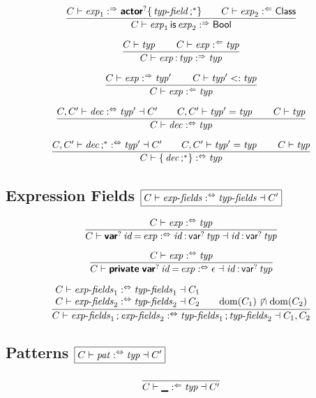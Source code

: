 $$
\frac{
  C \vdash \x{exp}_1 \synth \KK{actor}^? \K\{ \x{typ-field}\K;^\ast \K\}
  \qquad
  C \vdash \x{exp}_2 \anal \K{Class}
}{
  C \vdash \x{exp}_1 \K{is} \x{exp}_2 \synth \K{Bool}
}
$$

$$
\frac{
  C \vdash \x{typ}
  \qquad
  C \vdash \x{exp} \anal \x{typ}
}{
  C \vdash \x{exp} \K: \x{typ} \synth \x{typ}
}
$$

$$
\frac{
  C \vdash \x{exp} \synth \x{typ}'
  \qquad
  C \vdash \x{typ}' <: \x{typ}
}{
  C \vdash \x{exp} \anal \x{typ}
}
$$

$$
\frac{
  C, C' \vdash \x{dec} \analsynth \x{typ}' \dashv C'
  \qquad
  C, C' \vdash \x{typ}' = \x{typ}
  \qquad
  C \vdash \x{typ}
}{
  C \vdash \x{dec} \analsynth \x{typ}
}
$$

$$
\frac{
  C, C' \vdash \x{dec}\K;^\ast \analsynth \x{typ}' \dashv C'
  \qquad
  C, C' \vdash \x{typ}' = \x{typ}
  \qquad
  C \vdash \x{typ}
}{
  C \vdash \K\{ \x{dec}\K;^\ast \K\} \analsynth \x{typ}
}
$$


\subsection*{Expression Fields \hfill $\boxed{C \vdash \x{exp-fields} \analsynth \x{typ-fields} \dashv C'}$}

$$
\frac{
  C \vdash \x{exp} \analsynth \x{typ}
}{
  C \vdash \KK{var}^? \x{id} \K= \x{exp} \analsynth \x{id} \K: \, \K{var}^? \x{typ} \dashv \x{id} \K: \, \K{var}^? \x{typ}
}
$$

$$
\frac{
  C \vdash \x{exp} \analsynth \x{typ}
}{
  C \vdash \KK{private} \; \KK{var}^? \x{id} \K= \x{exp} \analsynth \epsilon \dashv \x{id} \K: \, \K{var}^? \x{typ}
}
$$

$$
\frac{
  \begin{array}{@{}l@{\qquad}l@{}}
  C \vdash \x{exp-fields}_1 \analsynth \x{typ-fields}_1 \dashv C_1
  \\
  C \vdash \x{exp-fields}_2 \analsynth \x{typ-fields}_2 \dashv C_2
  &
  \Dom(C_1) \setdisj \Dom(C_2)
  \end{array}
}{
  C \vdash \x{exp-fields}_1 \K; \x{exp-fields}_2 \analsynth \x{typ-fields}_1 \K; \x{typ-fields}_2 \dashv C_1, C_2
}
$$


\subsection*{Patterns \hfill $\boxed{C \vdash \x{pat} \analsynth \x{typ} \dashv C'}$}

$$
\frac{
}{
  C \vdash \KK\textunderscore \anal \x{typ} \dashv C'
}
$$

